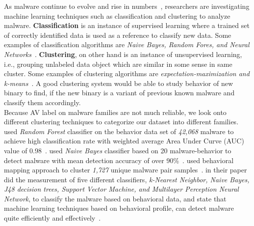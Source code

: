 As malware continue to evolve and rise in numbers~\cite[]{barecloud,avtest}, researchers are investigating machine learning techniques such as classification and clustering to analyze malware.
\textbf{Classification} is an instance of supervised learning where a trained set of correctly identified data is used as a reference to classify new data.
Some examples of classification algorithms are \emph{Naive Bayes, Random Fores, and Neural Networks}~\cite[]{classification}.
\textbf{Clustering}, on other hand is an instance of unsupervised learning, i.e., grouping unlabeled data object which are similar in some sense in same cluster.
Some examples of clustering algorithms are \emph{expectation-maximization and k-means}~\cite[]{clustering}.
A good clustering system would be able to study behavior of new binary to find, if the new binary is a variant of previous known malware and classify them accordingly.\\
Because AV label on malware families are not much reliable, we look onto different clustering techniques to categorize our dataset into different families.
\textbf{\citeauthor{pirscoveanu}} used \emph{Random Forest} classifier on the behavior data set of \emph{42,068} malware to achieve high classification rate with weighted average Area Under Curve (AUC) value of 0.98~\cite[]{pirscoveanu}.
\textbf{\citeauthor{mosko}} used \emph{Naive Bayes} classifier based on 20 malware-behavior to detect malware with mean detection accuracy of over 90\%~\cite[]{mosko}.
\textbf{\citeauthor{yavvari}} used behavioral mapping approach to cluster \emph{1,727} unique malware pair samples~\cite[]{yavvari}.
\textbf{\citeauthor{firdausi}} in their paper did the measurement of five different classifiers, \emph{k-Nearest Neighbor, Naive Bayes, J48 decision trees, Support Vector Machine, and Multilayer Perception Neural Network}, to classify the malware based on behavioral data, and state that machine learning techniques based on behavioral profile, can detect malware quite efficiently and effectively~\cite[]{firdausi}.

